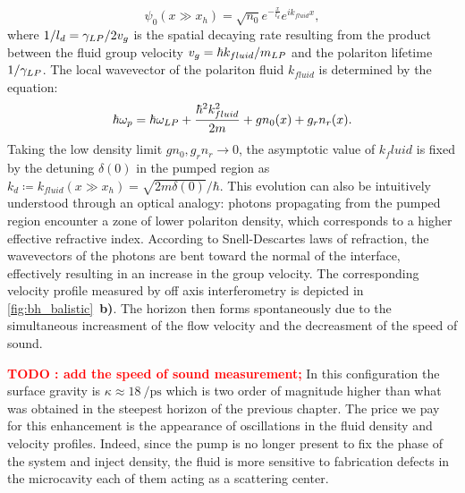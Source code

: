 \begin{equation}
    \psi_0(x \gg x_h) = \sqrt{n_0}e^{-\frac{x}{l_d}}e^{i k_{fluid}x},
\end{equation}
where $1/l_d=\gamma_{LP}/2v_g$ is the spatial decaying rate resulting from the product between the fluid group velocity $v_g =\hbar k_{fluid}/m_{LP} $ and the polariton lifetime $1/\gamma_{LP}$. The local wavevector of the polariton fluid $k_{fluid}$ is determined by the equation: 
\begin{equation} 
    \hbar \omega_p = \hbar \omega_{LP} + \frac{\hbar^2 k_{fluid}^2}{2m} + gn_0(x) + g_r n_r(x).
    \label{eq:bernoulli}
\end{equation}
Taking the low density limit $gn_0, g_rn_r \to 0$, the asymptotic value of $k_fluid$ is fixed by the detuning $\delta(0)$ in the pumped region as $k_d \coloneqq k_{fluid}(x \gg x_h) = \sqrt{2m\delta(0)}/\hbar$.
This evolution can also be intuitively understood through an optical analogy: photons propagating from the pumped region encounter a zone of lower polariton density, which corresponds to a higher effective refractive index. According to Snell-Descartes laws of refraction, the wavevectors of the photons are bent toward the normal of the interface, effectively resulting in an increase in the group velocity. 
The corresponding velocity profile measured by off axis interferometry is depicted in \autoref{fig:bh_balistic}~\textbf{b)}.  The horizon then forms
spontaneously due to the simultaneous increasment of the flow velocity and the decreasment of the speed of sound.

\bigskip


\textcolor{red}{\textbf{TODO : add the speed of sound measurement;}}
In this configuration the surface gravity is $\kappa\approx \SI{18}{\per \pico \second}$ which is two order of magnitude higher than what was obtained 
in the steepest horizon of the previous chapter. The price we pay for this enhancement is the appearance of oscillations in the fluid density and velocity profiles.
Indeed, since the pump is no longer present to fix the phase of the system and inject density, the fluid is more sensitive to fabrication defects in the microcavity each of them
acting as a scattering center.



